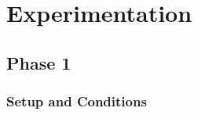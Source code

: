 
\chapter{Experimentation} %

\label{Chapter4} %



\section{Phase 1}


\subsection{Setup and Conditions}



%



\newpage

